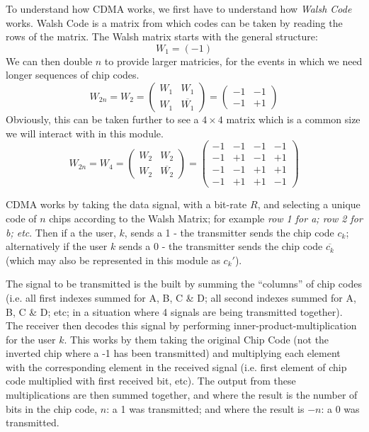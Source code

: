 To understand how CDMA works, we first have to understand how \textit{Walsh Code} works. Walsh Code is a matrix from which codes can be taken by reading the rows of the matrix. The Walsh matrix starts with the general structure:
\[W_1=(-1)\]
We can then double $n$ to provide larger matricies, for the events in which we need longer sequences of chip codes.
\begin{equation*}
W_{2n} = W_2 =
\begin{pmatrix}
    W_1 & W_1\\
    W_1 & \overline{W_1}
\end{pmatrix}
=
\begin{pmatrix}
    -1 & -1\\
    -1 & +1
\end{pmatrix}
\end{equation*}
Obviously, this can be taken further to see a $4\times4$ matrix which is a common size we will interact with in this module.
\begin{equation*}
W_{2n} = W_4 = 
\begin{pmatrix}
    W_2 & W_2 \\
    W_2 & \overline{W_2}
\end{pmatrix}
=
\begin{pmatrix}
    -1 & -1 & -1 & -1\\
    -1 & +1 & -1 & +1\\
    -1 & -1 & +1 & +1\\
    -1 & +1 & +1 & -1
\end{pmatrix}
\end{equation*}

CDMA works by taking the data signal, with a bit-rate $R$, and selecting a unique code of $n$ chips according to the Walsh Matrix; for example \textit{row 1 for a; row 2 for b; etc}. Then if a the user, $k$, sends a 1 - the transmitter sends the chip code $c_k$; alternatively if the user $k$ sends a 0 - the transmitter sends the chip code $\overline{c_k}$ (which may also be represented in this module as $c_k'$).

The signal to be transmitted is the built by summing the ``columns'' of chip codes (i.e. all first indexes summed for A, B, C \& D; all second indexes summed for A, B, C \& D; etc; in a situation where 4 signals are being transmitted together). The receiver then decodes this signal by performing inner-product-multiplication for the user $k$. This works by them taking the original Chip Code (not the inverted chip where a -1 has been transmitted) and multiplying each element with the corresponding element in the received signal (i.e. first element of chip code multiplied with first received bit, etc). The output from these multiplications are then summed together, and where the result is the number of bits in the chip code, $n$: a 1 was transmitted; and where the result is $-n$: a 0 was transmitted. 

